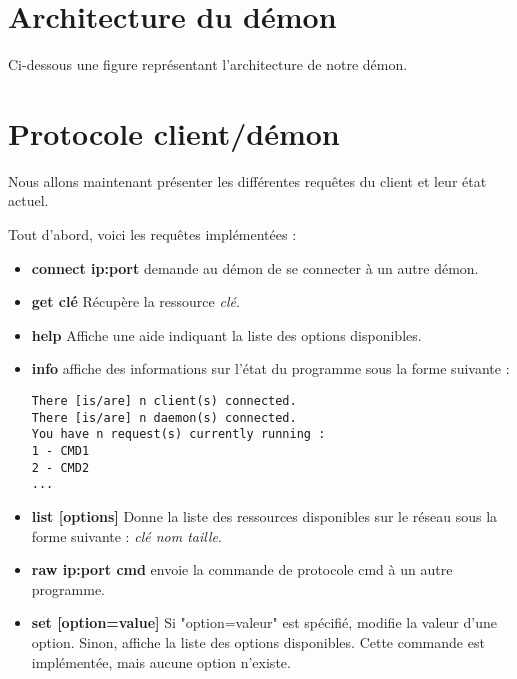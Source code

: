 	\section{Architecture du démon}
Ci-dessous une figure représentant l'architecture de notre démon.
	
    \section{Protocole client/démon}\label{protclient}
    Nous allons maintenant présenter les différentes requêtes du client et leur état actuel.

    Tout d'abord, voici les requêtes implémentées :
\begin{itemize}
\item{\textbf{connect ip:port}} demande au démon de se connecter à un autre
démon. 

\item{\textbf{get clé}} Récupère la ressource \textit{clé}.

\item{\textbf{help}} Affiche une aide indiquant la liste des options
disponibles. 

\item{\textbf{info}} affiche des informations sur l'état du programme sous la
forme suivante :
\begin{verbatim}
There [is/are] n client(s) connected.
There [is/are] n daemon(s) connected.
You have n request(s) currently running :
1 - CMD1
2 - CMD2
...
\end{verbatim}

\item{\textbf{list [options]}} Donne la liste des ressources disponibles sur
le réseau sous la forme suivante : \textit{clé nom taille}.

\item{\textbf{raw ip:port cmd}} envoie la commande de protocole cmd à un autre programme.

\item{\textbf{set [option=value]}} Si "option=valeur" est spécifié, modifie la valeur
d'une option. Sinon, affiche la liste des options disponibles. Cette commande
est implémentée, mais aucune option n'existe.

\end{itemize}

\paragraph{}

